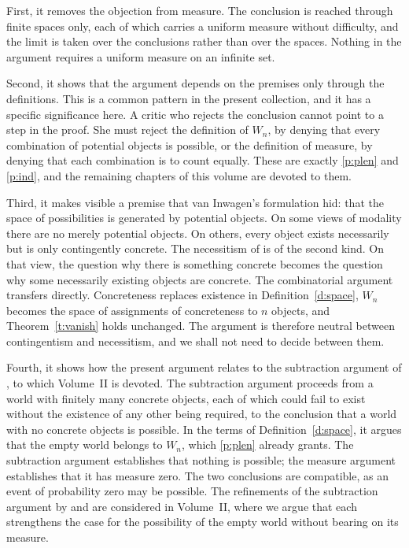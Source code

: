 \documentclass{situationist-preprint}
\begin{document}
First, it removes the objection from measure. The conclusion is reached through finite spaces only, each of which carries a uniform measure without difficulty, and the limit is taken over the conclusions rather than over the spaces. Nothing in the argument requires a uniform measure on an infinite set.

Second, it shows that the argument depends on the premises only through the definitions. This is a common pattern in the present collection, and it has a specific significance here. A critic who rejects the conclusion cannot point to a step in the proof. She must reject the definition of $W_n$, by denying that every combination of potential objects is possible, or the definition of measure, by denying that each combination is to count equally. These are exactly \ref{p:plen} and \ref{p:ind}, and the remaining chapters of this volume are devoted to them.

Third, it makes visible a premise that van Inwagen's formulation hid: that the space of possibilities is generated by potential objects. On some views of modality there are no merely potential objects. On others, every object exists necessarily but is only contingently concrete. The necessitism of \citet{Williamson2013} is of the second kind. On that view, the question why there is something concrete becomes the question why some necessarily existing objects are concrete. The combinatorial argument transfers directly. Concreteness replaces existence in Definition~\ref{d:space}, $W_n$ becomes the space of assignments of concreteness to $n$ objects, and Theorem~\ref{t:vanish} holds unchanged. The argument is therefore neutral between contingentism and necessitism, and we shall not need to decide between them.

Fourth, it shows how the present argument relates to the subtraction argument of \citet{Baldwin1996}, to which Volume~II is devoted. The subtraction argument proceeds from a world with finitely many concrete objects, each of which could fail to exist without the existence of any other being required, to the conclusion that a world with no concrete objects is possible. In the terms of Definition~\ref{d:space}, it argues that the empty world belongs to $W_n$, which \ref{p:plen} already grants. The subtraction argument establishes that nothing is possible; the measure argument establishes that it has measure zero. The two conclusions are compatible, as an event of probability zero may be possible. The refinements of the subtraction argument by \citet{RodriguezPereyra1997} and \citet{EfirdStoneham2005} are considered in Volume~II, where we argue that each strengthens the case for the possibility of the empty world without bearing on its measure.
\end{document}
